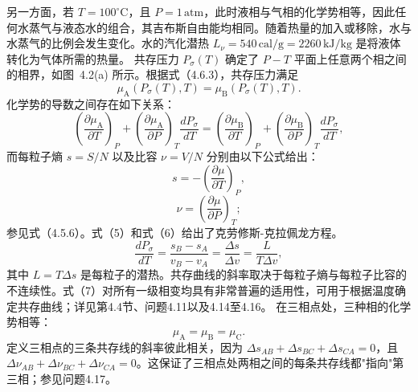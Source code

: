 另一方面，若 \(T=100^{\circ}\mathrm{C}\)，且 \(P=1\,\mathrm{atm}\)，此时液相与气相的化学势相等，因此任何水蒸气与液态水的组合，其吉布斯自由能均相同。随着热量的加入或移除，水与水蒸气的比例会发生变化。水的汽化潜热 \(L_{\nu}=540\,\mathrm{cal/g}=2260\,\mathrm{kJ/kg}\) 是将液体转化为气体所需的热量。
共存压力 \(P_{\sigma}(T)\) 确定了 \(P-T\) 平面上任意两个相之间的相界，如图~4.2(a) 所示。根据式（4.6.3），共存压力满足
\begin{equation}\tag{4.5.17}\label{eq:4.5.17}
\mu _ { \mathrm { A } } ( P _ { \sigma } ( T ) , T ) = \mu _ { \mathrm { B } } ( P _ { \sigma } ( T ) , T ) .
\end{equation}
化学势的导数之间存在如下关系：
\begin{equation}\tag{4.5.18}\label{eq:4.5.18}
\left( \frac { \partial \mu _ { \mathrm { A } } } { \partial T } \right) _ { P } + \left( \frac { \partial \mu _ { \mathrm { A } } } { \partial P } \right) _ { T } \frac { d P _ { \sigma } } { d T } = \left( \frac { \partial \mu _ { \mathrm { B } } } { \partial T } \right) _ { P } + \left( \frac { \partial \mu _ { \mathrm { B } } } { \partial P } \right) _ { T } \frac { d P _ { \sigma } } { d T } ,
\end{equation}
而每粒子熵 \(s = S/N\) 以及比容 \(\nu = V/N\) 分别由以下公式给出：
\begin{equation}\tag{4.5.19}\label{eq:4.5.19}
s = - \left( { \frac { \partial \mu } { \partial T } } \right) _ { P } ,
\end{equation}
\begin{equation}\tag{4.5.20}\label{eq:4.5.20}
\nu = \left( { \frac { \partial \mu } { \partial P } } \right) _ { T } ;
\end{equation}
参见式（4.5.6）。式（5）和式（6）给出了克劳修斯-克拉佩龙方程。
\begin{equation}\tag{4.5.21}\label{eq:4.5.21}
\frac { d P _ { \sigma } } { d T } = \frac { s _ { B } - s _ { A } } { v _ { B } - v _ { A } } = \frac { \Delta s } { \Delta v } = \frac { L } { T \Delta v } ,
\end{equation}
其中 \(L = T\Delta s\) 是每粒子的潜热。共存曲线的斜率取决于每粒子熵与每粒子比容的不连续性。式（7）对所有一级相变均具有非常普遍的适用性，可用于根据温度确定共存曲线；详见第4.4节、问题4.11以及4.14至4.16。
在三相点处，三种相的化学势相等：
\begin{equation}\tag{4.5.22}\label{eq:4.5.22}
\mu _ { \mathrm { A } } = \mu _ { \mathrm { B } } = \mu _ { \mathrm { C } } .
\end{equation}
定义三相点的三条共存线的斜率彼此相关，因为 \(\Delta s_{AB} + \Delta s_{BC} + \Delta s_{CA} = 0\)，且 \(\Delta \nu_{AB} + \Delta \nu_{BC} + \Delta \nu_{CA} = 0\)。这保证了三相点处两相之间的每条共存线都"指向"第三相；参见问题4.17。
